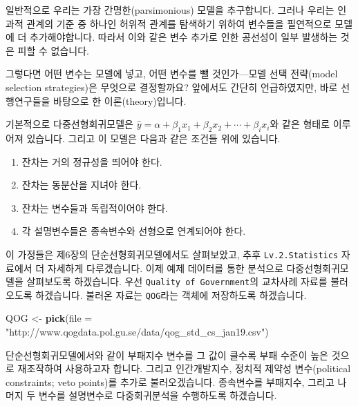 \documentclass[]{book}
\newenvironment{Shaded}{\begin{snugshade}}{\end{snugshade}}
\newcommand{\DataTypeTok}[1]{\textcolor[rgb]{0.13,0.29,0.53}{#1}}
\newcommand{\DecValTok}[1]{\textcolor[rgb]{0.00,0.00,0.81}{#1}}
\newcommand{\KeywordTok}[1]{\textcolor[rgb]{0.13,0.29,0.53}{\textbf{#1}}}
\newcommand{\NormalTok}[1]{#1}
\newcommand{\OperatorTok}[1]{\textcolor[rgb]{0.81,0.36,0.00}{\textbf{#1}}}
\newcommand{\StringTok}[1]{\textcolor[rgb]{0.31,0.60,0.02}{#1}}
\providecommand{\tightlist}{%
  \setlength{\itemsep}{0pt}\setlength{\parskip}{0pt}}
\begin{document}
일반적으로 우리는 가장 간명한(parsimonious) 모델을 추구합니다. 그러나 우리는 인과적 관계의 기준 중 하나인 허위적 관계를 탐색하기 위하여 변수들을 필연적으로 모델에 더 추가해야합니다. 따라서 이와 같은 변수 추가로 인한 공선성이 일부 발생하는 것은 피할 수 없습니다.

그렇다면 어떤 변수는 모델에 넣고, 어떤 변수를 뺄 것인가---모델 선택 전략(model selection strategies)은 무엇으로 결정할까요? 앞에서도 간단히 언급하였지만, 바로 선행연구들을 바탕으로 한 이론(theory)입니다.

기본적으로 다중선형회귀모델은 \(\hat{y} = \alpha + \beta_1x_1 + \beta_2x_2 + \cdots + \beta_ix_i\)와 같은 형태로 이루어져 있습니다. 그리고 이 모델은 다음과 같은 조건들 위에 있습니다.

\begin{enumerate}
\def\labelenumi{\arabic{enumi}.}
\tightlist
\item
  잔차는 거의 정규성을 띄어야 한다.
\item
  잔차는 동분산을 지녀야 한다.
\item
  잔차는 변수들과 독립적이어야 한다.
\item
  각 설명변수들은 종속변수와 선형으로 연계되어야 한다.
\end{enumerate}

이 가정들은 제6장의 단순선형회귀모델에서도 살펴보았고, 추후 \texttt{Lv.2.Statistics} 자료에서 더 자세하게 다루겠습니다. 이제 예제 데이터를 통한 분석으로 다중선형회귀모델을 살펴보도록 하겠습니다. 우선 \texttt{Quality\ of\ Government}의 교차사례 자료를 불러오도록 하겠습니다. 불러온 자료는 \texttt{QOG}라는 객체에 저장하도록 하겠습니다.

\begin{Shaded}
\begin{Highlighting}[]
\NormalTok{QOG <-}\StringTok{ }\KeywordTok{pick}\NormalTok{(}\DataTypeTok{file =} \StringTok{"http://www.qogdata.pol.gu.se/data/qog_std_cs_jan19.csv"}\NormalTok{)}
\end{Highlighting}
\end{Shaded}

단순선형회귀모델에서와 같이 부패지수 변수를 그 값이 클수록 부패 수준이 높은 것으로 재조작하여 사용하고자 합니다. 그리고 인간개발지수, 정치적 제약성 변수(political constraints; veto points)를 추가로 불러오겠습니다. 종속변수를 부패지수, 그리고 나머지 두 변수를 설명변수로 다중회귀분석을 수행하도록 하겠습니다.

\begin{Shaded}
\end{Shaded}
\end{document}
